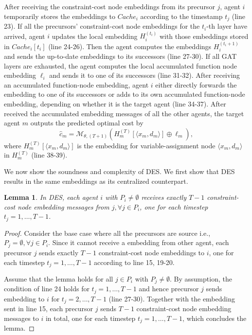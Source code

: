 \documentclass[letterpaper]{article} %
\begin{document}
After receiving the constraint-cost node embeddings from its precursor $j$, agent $i$ temporarily stores the embeddings to $Cache_i$ according to the timestamp $t_j$ (line 23). If all the precursors' constraint-cost node embeddings for the $t_i$-th layer have arrived, agent $i$ updates the local embedding $H_i^{(t_i)}$ with those embeddings stored in $Cache_i[t_i]$ (line 24-26). Then the agent computes the embeddings $H_i^{(t_i+1)}$ and sends the up-to-date embeddings to its successors (line 27-30). If all GAT layers are exhausted, the agent computes the local accumulated function node embedding $\ell_i$ and sends it to one of its successors (line 31-32). After receiving an accumulated function-node embedding, agent $i$ either directly forwards the embedding to one of its successors or adds to its own accumulated function-node embedding, depending on whether it is the target agent (line 34-37). After received the accumulated embedding messages of all the other agents, the target agent $m$ outputs the predicted optimal cost by
\begin{equation}
    \hat{c}_m=\mathcal{M}_{\theta, (T+1)}(H_m^{(T)}[\langle x_m,d_m\rangle]\oplus \ell_m), \label{eq-dis-mlp}
\end{equation}
where $H_m^{(T)}[\langle x_m,d_m\rangle]$ is the embedding for variable-assignment node $\langle x_m,d_m\rangle$ in $H_m^{(T)}$ (line 38-39).

\newtheorem{proposition}{Proposition}
\newtheorem{lemma}{Lemma}
We now show the soundness and complexity of DES. We first show that DES results in the same embeddings as its centralized counterpart.
\begin{lemma}
In DES, each agent $i$ with $P_i\ne \emptyset$ receives exactly $T-1$ constraint-cost node embedding messages from $j,\forall j\in P_i$, one for each timestep $t_j=1,\dots,T-1$.
\end{lemma}
\begin{proof}
Consider the base case where all the precursors are source i.e., $P_j=\emptyset,\forall j\in P_i$. Since it cannot receive a embedding from other agent, each precursor $j$ sends exactly $T-1$ constraint-cost node embeddings to $i$, one for each timestep $t_j=1,\dots,T-1$ according to line 15, 19-20.

Assume that the lemma holds for all $j\in P_i$ with $P_j\ne\emptyset$. By assumption, the condition of line 24 holds for $t_j=1,\dots,T-1$ and hence precursor $j$ sends embedding to $i$ for $t_j=2,\dots,T-1$ (line 27-30). Together with the embedding sent in line 15, each precursor $j$ sends $T-1$ constraint-cost node embedding messages to $i$ in total, one for each timestep $t_j=1,\dots,T-1$, which concludes the lemma.
\end{proof}
\end{document}
